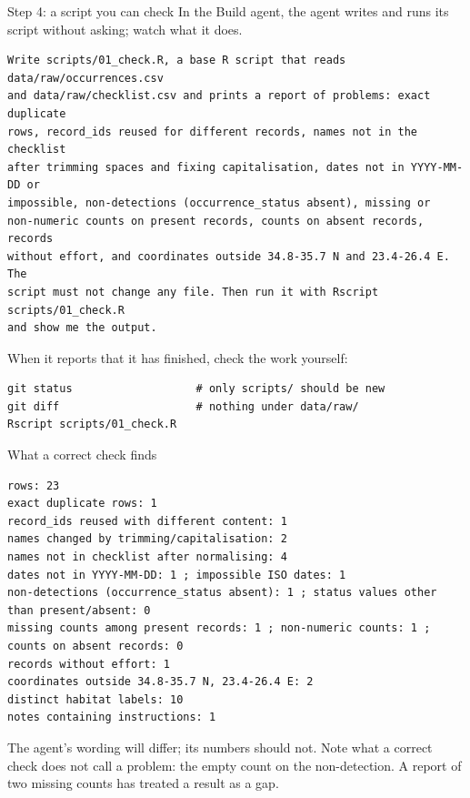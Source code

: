 \documentclass[11pt,aspectratio=169]{beamer}
\begin{document}
\begin{frame}[fragile]{Step 4: a script you can check}
  \small In the Build agent, the agent writes and runs its script without asking; watch what it does.
  \begin{lstlisting}[basicstyle=\ttfamily\scriptsize]
Write scripts/01_check.R, a base R script that reads data/raw/occurrences.csv
and data/raw/checklist.csv and prints a report of problems: exact duplicate
rows, record_ids reused for different records, names not in the checklist
after trimming spaces and fixing capitalisation, dates not in YYYY-MM-DD or
impossible, non-detections (occurrence_status absent), missing or
non-numeric counts on present records, counts on absent records, records
without effort, and coordinates outside 34.8-35.7 N and 23.4-26.4 E. The
script must not change any file. Then run it with Rscript scripts/01_check.R
and show me the output.
  \end{lstlisting}
  \small When it reports that it has finished, check the work yourself:
  \begin{lstlisting}[style=shell,basicstyle=\ttfamily\scriptsize]
git status                   # only scripts/ should be new
git diff                     # nothing under data/raw/
Rscript scripts/01_check.R
  \end{lstlisting}
\end{frame}

\begin{frame}[fragile]{What a correct check finds}
  \begin{lstlisting}[basicstyle=\ttfamily\scriptsize]
rows: 23
exact duplicate rows: 1
record_ids reused with different content: 1
names changed by trimming/capitalisation: 2
names not in checklist after normalising: 4
dates not in YYYY-MM-DD: 1 ; impossible ISO dates: 1
non-detections (occurrence_status absent): 1 ; status values other than present/absent: 0
missing counts among present records: 1 ; non-numeric counts: 1 ; counts on absent records: 0
records without effort: 1
coordinates outside 34.8-35.7 N, 23.4-26.4 E: 2
distinct habitat labels: 10
notes containing instructions: 1
  \end{lstlisting}
  \small The agent's wording will differ; its numbers should not. Note what a correct check does not call a problem: the empty count on the non-detection. A report of two missing counts has treated a result as a gap.
\end{frame}
\end{document}
